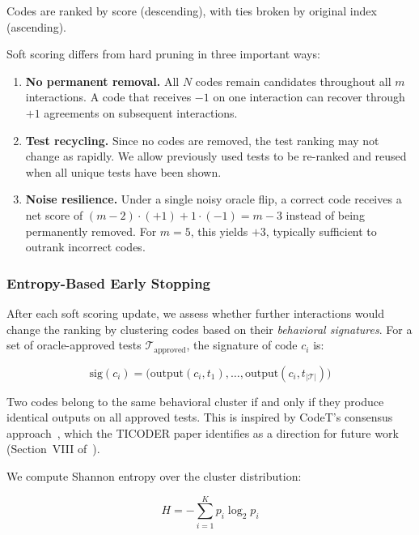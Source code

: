 \documentclass[conference]{IEEEtran}
\begin{document}
Codes are ranked by score (descending), with ties broken by original index (ascending).

Soft scoring differs from hard pruning in three important ways:

\begin{enumerate}
    \item \textbf{No permanent removal.} All $N$ codes remain candidates throughout all $m$ interactions. A code that receives $-1$ on one interaction can recover through $+1$ agreements on subsequent interactions.
    \item \textbf{Test recycling.} Since no codes are removed, the test ranking may not change as rapidly. We allow previously used tests to be re-ranked and reused when all unique tests have been shown.
    \item \textbf{Noise resilience.} Under a single noisy oracle flip, a correct code receives a net score of $(m-2) \cdot (+1) + 1 \cdot (-1) = m - 3$ instead of being permanently removed. For $m=5$, this yields $+3$, typically sufficient to outrank incorrect codes.
\end{enumerate}

\subsubsection{Entropy-Based Early Stopping}

After each soft scoring update, we assess whether further interactions would change the ranking by clustering codes based on their \emph{behavioral signatures}. For a set of oracle-approved tests $\mathcal{T}_{\text{approved}}$, the signature of code $c_i$ is:

\begin{equation}
    \text{sig}(c_i) = \big(\text{output}(c_i, t_1), \ldots, \text{output}(c_i, t_{|\mathcal{T}|})\big)
\end{equation}

Two codes belong to the same behavioral cluster if and only if they produce identical outputs on all approved tests. This is inspired by CodeT's consensus approach~\cite{chen2022codet}, which the TICODER paper identifies as a direction for future work (Section~VIII of~\cite{ticoder}).

We compute Shannon entropy over the cluster distribution:

\begin{equation}
    H = -\sum_{i=1}^{K} p_i \log_2 p_i
\end{equation}
\end{document}
